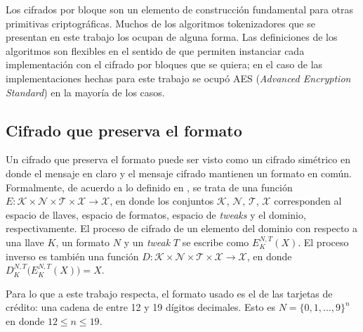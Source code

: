 Los cifrados por bloque son un elemento de construcción fundamental para otras
primitivas criptográficas. Muchos de los algoritmos tokenizadores que se
presentan en este trabajo los ocupan de alguna forma. Las definiciones de los
algoritmos son flexibles en el sentido de que permiten instanciar cada
implementación con el cifrado por bloques que se quiera; en el caso de las
implementaciones hechas para este trabajo se ocupó AES (\textit{Advanced
Encryption Standard}) en la mayoría de los casos.

\subsection{Cifrado que preserva el formato}



Un cifrado que preserva el formato puede ser visto como un cifrado simétrico en
donde el mensaje en claro y el mensaje cifrado mantienen un formato en común.
Formalmente, de acuerdo a lo definido en \cite{DBLP:conf/sacrypt/BellareRRS09},
se trata de una función $ E: \mathcal{K} \times \mathcal{N} \times \mathcal{T}
\times \mathcal{X} \rightarrow \mathcal{X} $, en donde los conjuntos $
\mathcal{K} $, $ \mathcal{N} $, $ \mathcal{T} $, $ \mathcal{X} $ corresponden al
espacio de llaves, espacio de formatos, espacio de \textit{tweaks} y el dominio,
respectivamente. El proceso de cifrado de un elemento del dominio con respecto a
una llave $ K $, un formato $ N $ y un \textit{tweak} $ T $ se escribe como  $
E_K^{N,T}(X) $. El proceso inverso es también una función $ D: \mathcal{K}
\times \mathcal{N} \times \mathcal{T} \times \mathcal{X} \rightarrow
\mathcal{X} $, en donde $ D_K^{N,T}\big( E_K^{N,T}(X) \big) = X $.


Para lo que a este trabajo respecta, el formato usado es el de las tarjetas de
crédito: una cadena de entre 12 y 19 dígitos decimales. Esto es $ N = \{0, 1,
\dots, 9\}^n $ en donde $ 12 \leq n \leq 19 $.

